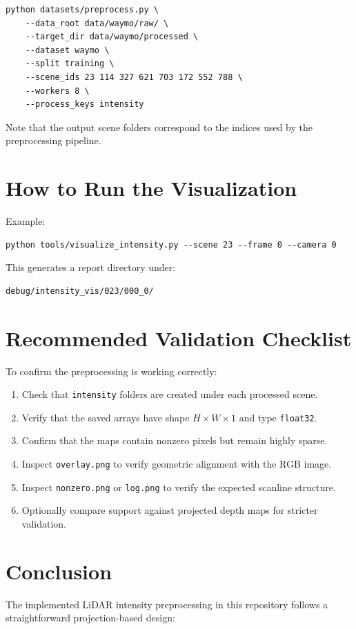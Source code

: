 \documentclass[11pt]{article}
\begin{document}
\begin{lstlisting}[style=bashstyle]
python datasets/preprocess.py \
    --data_root data/waymo/raw/ \
    --target_dir data/waymo/processed \
    --dataset waymo \
    --split training \
    --scene_ids 23 114 327 621 703 172 552 788 \
    --workers 8 \
    --process_keys intensity
\end{lstlisting}

Note that the output scene folders correspond to the indices used by the preprocessing pipeline.

\section{How to Run the Visualization}
Example:

\begin{lstlisting}[style=bashstyle]
python tools/visualize_intensity.py --scene 23 --frame 0 --camera 0
\end{lstlisting}

This generates a report directory under:

\begin{lstlisting}[style=bashstyle]
debug/intensity_vis/023/000_0/
\end{lstlisting}

\section{Recommended Validation Checklist}
To confirm the preprocessing is working correctly:

\begin{enumerate}[leftmargin=1.5em]
    \item Check that \texttt{intensity} folders are created under each processed scene.
    \item Verify that the saved arrays have shape $H \times W \times 1$ and type \texttt{float32}.
    \item Confirm that the maps contain nonzero pixels but remain highly sparse.
    \item Inspect \texttt{overlay.png} to verify geometric alignment with the RGB image.
    \item Inspect \texttt{nonzero.png} or \texttt{log.png} to verify the expected scanline structure.
    \item Optionally compare support against projected depth maps for stricter validation.
\end{enumerate}

\section{Conclusion}
The implemented LiDAR intensity preprocessing in this repository follows a straightforward projection-based design:
\end{document}
